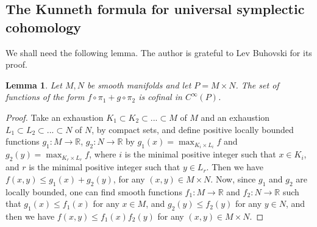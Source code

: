 \documentclass[11pt]{amsart}
\newtheorem{tm}{Theorem}[section]
\newtheorem{lm}[tm]{Lemma}
\theoremstyle{definition}
\theoremstyle{remark}
\begin{document}
\subsection{The Kunneth formula for universal symplectic cohomology}\label{subsecKunnethSH}

We shall need the following lemma. The author is grateful to Lev Buhovski for its proof.
\begin{lm}\label{lmSplitCofinal}
Let $M,N$ be smooth manifolds and let $P=M\times N$. The set of functions of the form $f\circ\pi_1+g\circ \pi_2$ is cofinal in $C^{\infty}(P)$.
\end{lm}
\begin{proof}
Take an exhaustion $ K_1 \subset K_2 \subset ... \subset M $ of $ M $ and an exhaustion $ L_1 \subset L_2 \subset ... \subset N $ of $ N $, by compact sets, and define positive locally bounded functions $ g_1 : M \rightarrow \mathbb{R} $, $ g_2 : N \rightarrow \mathbb{R} $ by
$ g_1(x) = \max_{K_i \times L_i} f $ and $ g_2(y) =  \max_{K_r \times L_r} f $, where $ i $ is the minimal positive integer such that $ x \in K_i $, and $ r $ is the minimal positive integer such that $ y \in L_r $. Then we have
$ f(x,y) \leqslant g_1(x)+g_2(y) $, for any $ (x,y) \in M \times N $. Now, since $ g_1 $ and $ g_2 $ are locally bounded, one can find smooth functions $ f_1 : M \rightarrow \mathbb{R} $ and $ f_2 : N \rightarrow \mathbb{R} $ such that
$ g_1(x) \leqslant f_1(x) $ for any $ x \in M $, and $ g_2(y) \leqslant f_2(y) $ for any $ y \in N $, and then we have
$ f(x,y) \leqslant f_1(x) f_2(y) $ for any $ (x,y) \in M \times N $.
\end{proof}
\end{document}
